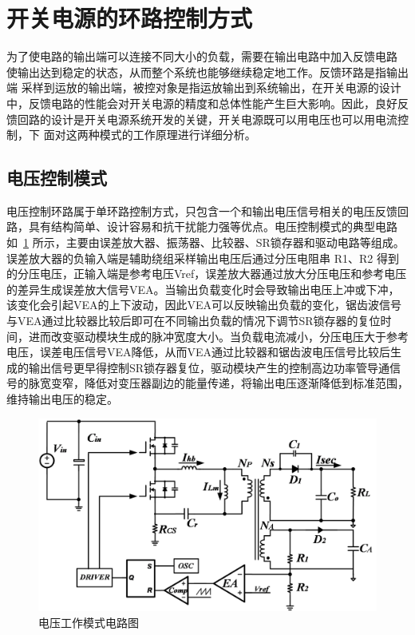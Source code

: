 \section{开关电源的环路控制方式}
为了使电路的输出端可以连接不同大小的负载，需要在输出电路中加入反馈电路 使输出达到稳定的状态，从而整个系统也能够继续稳定地工作。反馈环路是指输出端 采样到运放的输出端，被控对象是指运放输出到系统输出，在开关电源的设计中，反馈电路的性能会对开关电源的精度和总体性能产生巨大影响。因此，良好反馈回路的设计是开关电源系统开发的关键，开关电源既可以用电压也可以用电流控制，下 面对这两种模式的工作原理进行详细分析。

\subsection{电压控制模式}
电压控制环路属于单环路控制方式，只包含一个和输出电压信号相关的电压反馈回路，具有结构简单、设计容易和抗干扰能力强等优点。电压控制模式的典型电路如~\ref{fig:电压工作模式电路图} 所示，主要由误差放大器、振荡器、比较器、SR锁存器和驱动电路等组成。误差放大器的负输入端是辅助绕组采样输出电压后通过分压电阻串 R1、R2 得到的分压电压，正输入端是参考电压Vref，误差放大器通过放大分压电压和参考电压的差异生成误差放大信号VEA。当输出负载变化时会导致输出电压上冲或下冲，该变化会引起VEA的上下波动，因此VEA可以反映输出负载的变化，锯齿波信号与VEA通过比较器比较后即可在不同输出负载的情况下调节SR锁存器的复位时间，进而改变驱动模块生成的脉冲宽度大小。当负载电流减小，分压电压大于参考电压，误差电压信号VEA降低，从而VEA通过比较器和锯齿波电压信号比较后生成的输出信号更早得控制SR锁存器复位，驱动模块产生的控制高边功率管导通信号的脉宽变窄，降低对变压器副边的能量传递，将输出电压逐渐降低到标准范围，维持输出电压的稳定。

\begin{figure}[htbp] 
    \centering
    \includegraphics[width=0.8\linewidth]{figures/电压工作模式电路图.png}
    \caption{电压工作模式电路图}
    \label{fig:电压工作模式电路图}
\end{figure}

